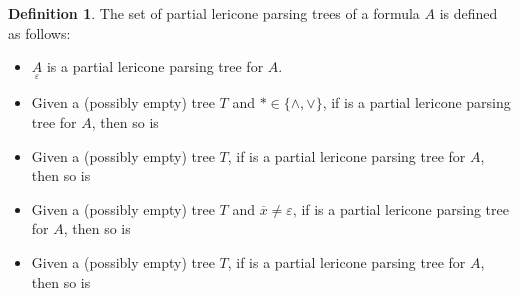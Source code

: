 \documentclass{amsart}
\theoremstyle{definition}
\newtheorem{mdef}{Definition}
\begin{document}
\begin{mdef}
    The set of partial lericone parsing trees of a formula $A$ is defined as follows:
    \begin{itemize}\setlength\itemsep{1ex}
        \item $\underset{\varepsilon}{A}$ is a partial lericone parsing tree for $A$.
        \item Given a (possibly empty) tree $T$ and $*\in\{\land,\lor\}$, if 
        is a partial lericone parsing tree for $A$, then so is  
        \item Given a (possibly empty) tree $T$, if 
        is a partial lericone parsing tree for $A$, then so is  
        \item Given a (possibly empty) tree $T$ and $\overline{x}\neq\varepsilon$, if 
        is a partial lericone parsing tree for $A$, then so is  
        \item Given a (possibly empty) tree $T$, if 
        is a partial lericone parsing tree for $A$, then so is  
    \end{itemize}
\end{mdef}
\end{document}
